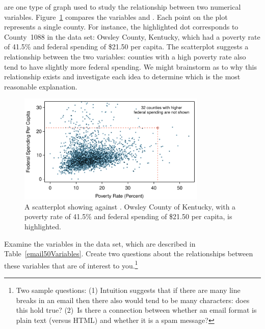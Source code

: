  are one type of graph used to study the relationship between two numerical variables. Figure~\ref{county_fed_spendVsPoverty} compares the variables  and . Each point on the plot represents a single county. For instance, the highlighted dot corresponds to County~1088 in the  data set: Owsley County, Kentucky, which had a poverty rate of 41.5\% and federal spending of \$21.50 per capita. The scatterplot suggests a relationship between the two variables: counties with a high poverty rate also tend to have slightly more federal spending. We might brainstorm as to why this relationship exists and investigate each idea to determine which is the most reasonable explanation.

\begin{figure}
\centering
\includegraphics[width=0.8\textwidth]{ch_intro_to_data/figures/county_fed_spendVsPoverty/county_fed_spendVsPoverty}
\caption{A scatterplot showing  against . Owsley County of Kentucky, with a poverty rate of 41.5\% and federal spending of \$21.50 per capita, is highlighted.}
\label{county_fed_spendVsPoverty}
\end{figure}

\begin{exercise}
Examine the variables in the  data set, which are described in Table~\vref{email50Variables}. Create two questions about the relationships between these variables that are of interest to you.\footnote{Two sample questions: (1) Intuition suggests that if there are many line breaks in an email then there also would tend to be many characters: does this hold true? (2)~Is there a connection between whether an email format is plain text (versus HTML) and whether it is a spam message?}
\end{exercise}

